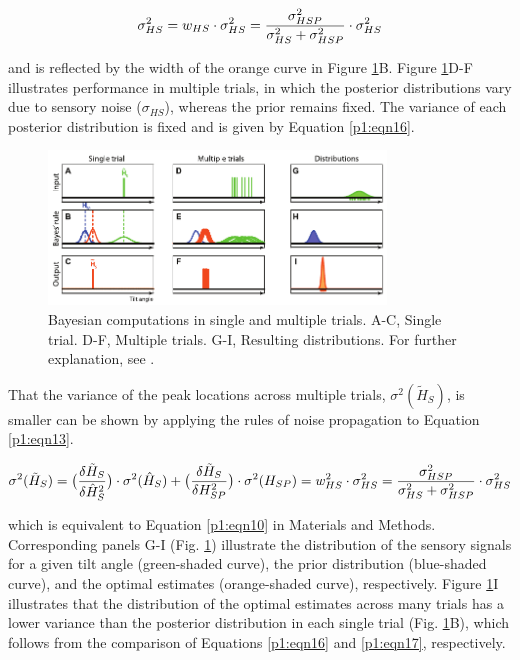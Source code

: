 \begin{equation}
\label{p1:eqn16}
\sigma^2_{HS} = w_{HS} \cdot \sigma^2_{HS} \\
              = \frac{\sigma^2_{HSP}}{\sigma^2_{HS} + \sigma^2_{HSP}} \cdot \sigma^2_{HS}
\end{equation}

and is reflected by the width of the orange curve in Figure \ref{p1:fig8}B. Figure \ref{p1:fig8}D-F illustrates performance in multiple trials, in which the posterior distributions vary due to sensory noise ($\sigma_{HS}$), whereas the prior remains fixed. The variance of each posterior distribution is fixed and is given by Equation \ref{p1:eqn16}. 

\begin{figure}
    \includegraphics[width=0.80\textwidth]{src/paper1/figure8.pdf}
    \caption{Bayesian computations in single and multiple trials. A-C, Single trial. D-F, Multiple trials. G-I, Resulting distributions. For further explanation, see .}
    \label{p1:fig8}
\end{figure}

That the variance of the peak locations across multiple trials, $\sigma^2(\tilde{H}_S)$, is smaller can be shown by applying the rules of noise propagation to Equation \ref{p1:eqn13}. 

\begin{equation}
\label{p1:eqn17}
\sigma^2(\tilde{H}_S) = \\
	\big( \frac{\delta\tilde{H}_S}{\delta\hat{H}_S^2} \big) \cdot \\
	\sigma^2(\hat{H}_S) + \\
	\big( \frac{\delta\tilde{H}_S}{\delta H_{SP}^2} \big) \cdot \\
	\sigma^2(H_{SP}) \\
	= w^2_{HS} \cdot \sigma^2_{HS} \\
	= \frac{\sigma^2_{HSP}}{\sigma^2_{HS} + \sigma^2_{HSP}} \cdot \sigma^2_{HS}
\end{equation}

which is equivalent to Equation \ref{p1:eqn10} in Materials and Methods. Corresponding panels G-I (Fig. \ref{p1:fig8}) illustrate the distribution of the sensory signals for a given tilt angle (green-shaded curve), the prior distribution (blue-shaded curve), and the optimal estimates (orange-shaded curve), respectively. Figure \ref{p1:fig8}I illustrates that the distribution of the optimal estimates across many trials has a lower variance than the posterior distribution in each single trial (Fig. \ref{p1:fig8}B), which follows from the comparison of Equations \ref{p1:eqn16} and \ref{p1:eqn17}, respectively. 

